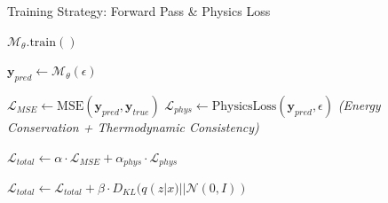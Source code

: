 \documentclass[aspectratio=169, 10pt]{beamer}
\begin{document}
\begin{frame}[fragile]{Training Strategy: Forward Pass \& Physics Loss}
    \centering
    \begin{algorithm}[H]
        \caption*{Physics-Informed Training Loop (Forward)}
        \begin{algorithmic}[1]
            
                \State $\mathcal{M}_{\theta}.\text{train}()$
                    
                    \State $\mathbf{y}_{pred} \leftarrow \mathcal{M}_{\theta}(\epsilon)$
                    
                    \State $\mathcal{L}_{MSE} \leftarrow \text{MSE}(\mathbf{y}_{pred}, \mathbf{y}_{true})$
                    \State $\mathcal{L}_{phys} \leftarrow \text{PhysicsLoss}(\mathbf{y}_{pred}, \epsilon)$
                    \State \hspace{2em} \textit{(Energy Conservation + Thermodynamic Consistency)}
                    
                    \State $\mathcal{L}_{total} \leftarrow \alpha \cdot \mathcal{L}_{MSE} + \alpha_{phys} \cdot \mathcal{L}_{phys}$
                    
                        \State $\mathcal{L}_{total} \leftarrow \mathcal{L}_{total} + \beta \cdot D_{KL}(q(z|x) || \mathcal{N}(0,I))$
                    \EndIf
                    
        \end{algorithmic}
    \end{algorithm}
\end{frame}
\end{document}
